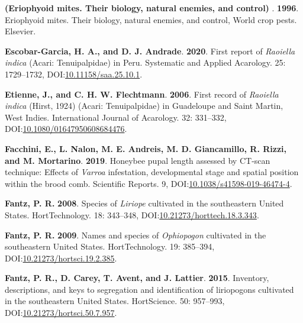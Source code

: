 \documentclass[12pt,final,CPage]{ufthesis}
\newlength{\cslhangindent}
\newenvironment{CSLReferences}[2] %
{%
	\setlength{\parindent}{0pt}
	\ifodd #1 \everypar{\setlength{\hangindent}{\cslhangindent}}\ignorespaces\fi
	\ifnum #2 > 0
	\setlength{\parskip}{#2\baselineskip}
	\fi
}%
{}
\begin{document}
{\begin{CSLReferences}{1}{0}
  \leavevmode{}%
  \textbf{(Eriophyoid mites. Their biology, natural enemies, and control) }. \textbf{1996}. Eriophyoid mites. Their biology, natural enemies, and control, World crop pests. Elsevier.

  \leavevmode{}%
  \textbf{Escobar-Garcia, H. A., and D. J. Andrade}. \textbf{2020}. First report of {\emph{Raoiella indica}} ({Acari}: {Tenuipalpidae}) in {Peru}. Systematic and Applied Acarology. 25: 1729--1732, DOI:\href{https://doi.org/10.11158/saa.25.10.1}{10.11158/saa.25.10.1}.

  \leavevmode{}%
  \textbf{Etienne, J., and C. H. W. Flechtmann}. \textbf{2006}. First record of {\emph{Raoiella indica}} ({Hirst}, 1924) ({Acari}: {Tenuipalpidae}) in {Guadeloupe} and {Saint Martin}, {West Indies}. International Journal of Acarology. 32: 331--332, DOI:\href{https://doi.org/10.1080/01647950608684476}{10.1080/01647950608684476}.

  \leavevmode{}%
  \textbf{Facchini, E., L. Nalon, M. E. Andreis, M. D. Giancamillo, R. Rizzi, and M. Mortarino}. \textbf{2019}. Honeybee pupal length assessed by {CT}-scan technique: Effects of {\emph{Varroa}} infestation, developmental stage and spatial position within the brood comb. Scientific Reports. 9, DOI:\href{https://doi.org/10.1038/s41598-019-46474-4}{10.1038/s41598-019-46474-4}.

  \leavevmode{}%
  \textbf{Fantz, P. R.} \textbf{2008}. Species of {\emph{Liriope}} cultivated in the southeastern {United States}. {HortTechnology}. 18: 343--348, DOI:\href{https://doi.org/10.21273/horttech.18.3.343}{10.21273/horttech.18.3.343}.

  \leavevmode{}%
  \textbf{Fantz, P. R.} \textbf{2009}. Names and species of {\emph{Ophiopogon}} cultivated in the southeastern {United States}. {HortTechnology}. 19: 385--394, DOI:\href{https://doi.org/10.21273/hortsci.19.2.385}{10.21273/hortsci.19.2.385}.

  \leavevmode{}%
  \textbf{Fantz, P. R., D. Carey, T. Avent, and J. Lattier}. \textbf{2015}. Inventory, descriptions, and keys to segregation and identification of liriopogons cultivated in the southeastern {United States}. {HortScience}. 50: 957--993, DOI:\href{https://doi.org/10.21273/hortsci.50.7.957}{10.21273/hortsci.50.7.957}.


\end{CSLReferences}}
\end{document}
